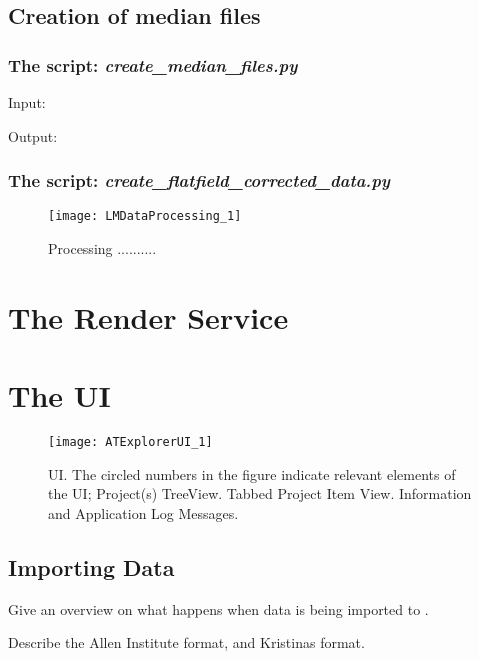 \subsection{Creation of median files}
\subsubsection{The script: \emph{create\_median\_files.py}}
Input: 

Output: 
\subsubsection{The script: \emph{create\_flatfield\_corrected\_data.py}}

\clearpage
\doublespacing

\begin{figure}[h]
\centering\texttt{[image: LMDataProcessing\_1]}

\caption{Processing ..........}
\end{figure}

\section{The Render Service}

\clearpage

\section{The \ate UI}

\begin{figure}[h]
\centering\texttt{[image: ATExplorerUI\_1]}

\caption{\ate{} UI. The circled numbers in the figure indicate relevant elements of the UI; \protect{} Project(s) TreeView. \protect{} Tabbed Project Item View. \protect{} Information and Application Log Messages.}
\end{figure}

\subsection{Importing Data}

\begin{description}[font=$\bullet$~\normalfont\scshape\color{red!50!black}]
\item [Importing process] Give an overview on what happens when data is being imported to \ate.
\item [Data Formats] Describe the Allen Institute format, and Kristinas format.
\end{description}

